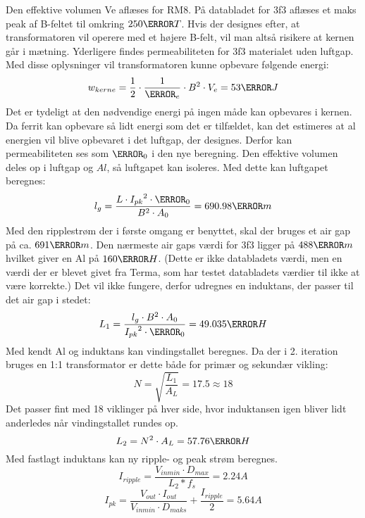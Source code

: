 \noindent Den effektive volumen Ve aflæses for RM8. På databladet for 3f3 aflæses et maks peak af B-feltet til omkring $250\milli T$. Hvis der designes efter, at transformatoren vil operere med et højere B-felt, vil man altså risikere at kernen går i mætning. Yderligere findes permeabiliteten for 3f3 materialet uden luftgap. Med disse oplysninger vil transformatoren kunne opbevare følgende energi:
\begin{equation} \label{Energy_no_gap}
w_{kerne} = \frac{1} {2} \cdot \frac{1}{\micro_e} \cdot B^2 \cdot V_e = 53\pico J
\end{equation}
Det er tydeligt at den nødvendige energi på ingen måde kan opbevares i kernen. Da ferrit kan opbevare så lidt energi som det er tilfældet, kan det estimeres at al energien vil blive opbevaret i det luftgap, der designes. Derfor kan permeabiliteten ses som $\micro_0$ i den nye beregning. Den effektive volumen deles op i luftgap og $Al$, så luftgapet kan isoleres. Med dette kan luftgapet beregnes: 
\begin{equation} \label{Airgap}
l_g = \frac{L \cdot {I_{pk}}^2 \cdot \micro_0}{B^2 \cdot A_0} = 690.98\micro m
\end{equation}
Med den ripplestrøm der i første omgang er benyttet, skal der bruges et air gap på ca. $691\micro m$. Den nærmeste air gaps værdi for 3f3 ligger på $488\micro m$ hvilket giver en Al på $160\nano H$. (Dette er ikke databladets værdi, men en værdi der er blevet givet fra Terma, som har testet databladets værdier til ikke at være korrekte.) Det vil ikke fungere, derfor udregnes en induktans, der passer til det air gap i stedet: 
\begin{equation} \label{L1}
L_1 = \frac{l_g \cdot B^2 \cdot A_0}{{I_{pk}}^2 \cdot \micro_0} = 49.035\micro H
\end{equation}
Med kendt Al og induktans kan vindingstallet beregnes. Da der i 2. iteration bruges en 1:1 transformator er dette både for primær og sekundær vikling:
\begin{equation} \label{N}
N = \sqrt{\frac{L_1}{A_L}} = 17.5 \approx 18
\end{equation}
Det passer fint med 18 viklinger på hver side, hvor induktansen igen bliver lidt anderledes når vindingstallet rundes op. 
\begin{equation} \label{L1}
L_2 = N^2 \cdot A_L = 57.76 \micro H
\end{equation}
Med fastlagt induktans kan ny ripple- og peak strøm beregnes.
\begin{equation} \label{I_ripple_CCM}
I_{ripple} = \frac{V_{inmin} \cdot D_{max}}{L_2*f_s} = 2.24A
\end{equation}
\begin{equation} \label{I_pk_CCM}
I_{pk} = \frac{V_{out} \cdot I_{out}}{V_{inmin} \cdot D_{maks}} + \frac{I_{ripple}}{2} = 5.64A
\end{equation}

